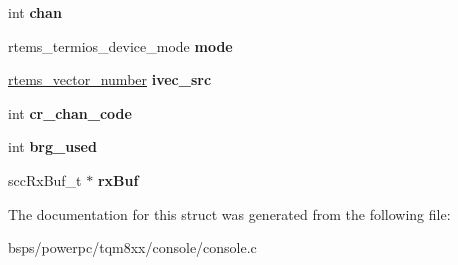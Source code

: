 \begin{DoxyCompactItemize}
\begin{tabbing}
\end{tabbing}\item 
\mbox{\label{structm8xx__console__chan__desc__s_a8b4ac5186ff1bec1c19fea71ce992c70}} 
int {\bfseries chan}
\item 
\mbox{\label{structm8xx__console__chan__desc__s_a79116ac15569cfb2abf3e5d673f6ef29}} 
rtems\+\_\+termios\+\_\+device\+\_\+mode {\bfseries mode}
\item 
\mbox{\label{structm8xx__console__chan__desc__s_aab14afadc53c9217a37c68dac700eda0}} 
\mbox{\hyperlink{group__ClassicINTR_ga3e434c197d99f128e78cae4d9358bd8b}{rtems\+\_\+vector\+\_\+number}} {\bfseries ivec\+\_\+src}
\item 
\mbox{\label{structm8xx__console__chan__desc__s_ade01b830ada0e122f005f8f4ef70795c}} 
int {\bfseries cr\+\_\+chan\+\_\+code}
\item 
\mbox{\label{structm8xx__console__chan__desc__s_ade4fef1bbddd195f391adc91dd8c3bfe}} 
int {\bfseries brg\+\_\+used}
\item 
\mbox{\label{structm8xx__console__chan__desc__s_adc454e38e7e4ffa47451a43c43bb9186}} 
scc\+Rx\+Buf\+\_\+t $\ast$ {\bfseries rx\+Buf}
\end{DoxyCompactItemize}


The documentation for this struct was generated from the following file\+:\begin{DoxyCompactItemize}
\item 
bsps/powerpc/tqm8xx/console/console.\+c\end{DoxyCompactItemize}
